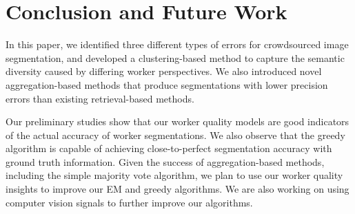 \section{Conclusion and Future Work}
In this paper, we identified three different types of errors for crowdsourced image segmentation, and developed a clustering-based method to capture the semantic diversity caused by differing worker perspectives. We also introduced novel aggregation-based methods that produce segmentations with lower precision errors than existing retrieval-based methods.
\par Our preliminary studies show that our worker quality models are good indicators of the actual accuracy of worker segmentations. We also observe that the greedy algorithm is capable of achieving close-to-perfect segmentation accuracy with ground truth information. 
Given the success of aggregation-based methods, including the simple majority vote algorithm, we plan to use our worker quality insights to improve our EM and greedy algorithms. 
We are also working on using computer vision signals to further improve our algorithms.
